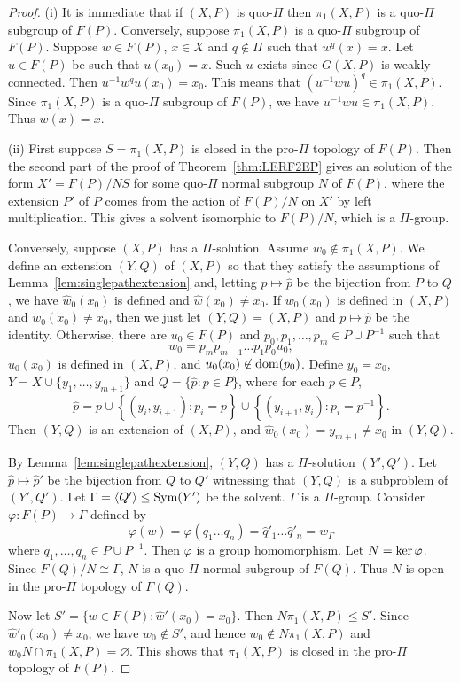 \documentclass[11pt]{amsart}
\theoremstyle{definition}
\theoremstyle{definition}
\numberwithin{equation}{section}
\begin{document}
\begin{proof} (i) It is immediate that if $(X, P)$ is quo-$\Pi$ then $\pi_1(X, P)$ is a quo-$\Pi$ subgroup of $F(P)$. Conversely, suppose $\pi_1(X, P)$ is a quo-$\Pi$ subgroup of $F(P)$. Suppose $w\in F(P)$, $x\in X$ and $q\not\in \Pi$ such that $w^q(x)=x$. Let $u\in F(P)$ be such that $u(x_0)=x$. Such $u$ exists since $G(X, P)$ is weakly connected. Then $u^{-1}w^qu(x_0)=x_0$. This means that $(u^{-1}wu)^q\in \pi_1(X, P)$. Since $\pi_1(X, P)$ is a quo-$\Pi$ subgroup of $F(P)$, we have $u^{-1}wu\in \pi_1(X, P)$. Thus $w(x)=x$. 

(ii) First suppose $S=\pi_1(X, P)$ is closed in the pro-$\Pi$ topology of $F(P)$. Then the second part of the proof of Theorem~\ref{thm:LERF2EP} gives an solution of the form $X'=F(P)/NS$ for some quo-$\Pi$ normal subgroup $N$ of $F(P)$, where the extension $P'$ of $P$ comes from the action of $F(P)/N$ on $X'$ by left multiplication. This gives a solvent isomorphic to $F(P)/N$, which is a $\Pi$-group.

Conversely, suppose $(X, P)$ has a $\Pi$-solution. Assume $w_0\not\in \pi_1(X, P)$.  We define an extension $(Y, Q)$ of $(X, P)$ so that they satisfy the assumptions of Lemma~\ref{lem:singlepathextension} and, letting $p\mapsto \hat{p}$ be the bijection from $P$ to $Q$, we have $\hat{w}_0(x_0)$ is defined and $\hat{w}(x_0)\neq x_0$. If $w_0(x_0)$ is defined in $(X, P)$ and $w_0(x_0)\neq x_0$, then we just let $(Y,Q)=(X, P)$ and $p\mapsto \hat{p}$ be the identity. Otherwise, there are $u_0\in F(P)$ and $p_0,p_1,\dots, p_m\in P\cup P^{-1}$ such that 
$$w_0=p_mp_{m-1}\dots p_1p_0u_0, $$
$u_0(x_0)$ is defined in $(X, P)$, and $u_0(x_0)\not\in\mbox{\rm dom}(p_0)$. Define $y_0=x_0$, $Y=X\cup \{y_1,\dots, y_{m+1}\}$ and $Q=\{\hat{p}\colon p\in P\}$, where for each $p\in P$,  
$$ \hat{p}=p\cup\left\{(y_i, y_{i+1})\colon p_i=p\right\}\cup \left\{(y_{i+1}, y_i)\colon p_i=p^{-1}\right\}. $$
Then $(Y, Q)$ is an extension of $(X, P)$, and $\hat{w}_0(x_0)=y_{m+1}\neq x_0$ in $(Y, Q)$. 

By Lemma~\ref{lem:singlepathextension}, $(Y, Q)$ has a $\Pi$-solution $(Y', Q')$. Let $\hat{p}\mapsto \hat{p}'$ be the bijection from $Q$ to $Q'$ witnessing that $(Y, Q)$ is a subproblem of $(Y', Q')$.  Let $\Gamma=\langle Q'\rangle\leq \mbox{\rm Sym}(Y')$ be the solvent. $\Gamma$ is a $\Pi$-group. Consider $\varphi\colon F(P)\to \Gamma$ defined by
$$ \varphi(w)=\varphi(q_1\dots q_n)=\hat{q}'_1\dots \hat{q}'_n=w_\Gamma $$
where $q_1, \dots, q_n\in P\cup P^{-1}$. Then $\varphi$ is a group homomorphism. Let $N=\mbox{\rm ker}\,\varphi$. Since $F(Q)/N\cong \Gamma$, $N$ is a quo-$\Pi$ normal subgroup of $F(Q)$. Thus $N$ is open in the pro-$\Pi$ topology of $F(Q)$.

Now let $S'=\{w\in F(P)\colon \hat{w}'(x_0)=x_0\}$. Then $N\pi_1(X,P)\leq S'$. Since $\hat{w}'_0(x_0)\neq x_0$, we have $w_0\not\in S'$, and hence $w_0\not\in N\pi_1(X, P)$ and $w_0N\cap \pi_1(X, P)=\varnothing$. This shows that $\pi_1(X, P)$ is closed in the pro-$\Pi$ topology of $F(P)$.
\end{proof}
\end{document}
